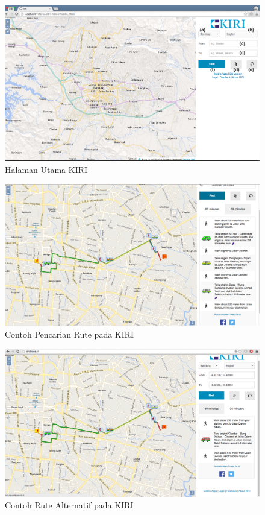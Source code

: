 \begin{figure}[H]
	\centering
	\includegraphics[scale=0.3]{Gambar/KIRI-main}
	\caption{Halaman Utama KIRI} 
	\label{fig:5_KIRI_main}
\end{figure}


\begin{figure}[H]
	\centering
	\includegraphics[scale=0.3]{Gambar/KIRI-find}
	\caption{Contoh Pencarian Rute pada KIRI} 
	\label{fig:5_KIRI_find}
\end{figure}

\begin{figure}[H]
	\centering
	\includegraphics[scale=0.3]{Gambar/KIRI-find-alternate}
	\caption{Contoh Rute Alternatif pada KIRI} 
	\label{fig:5_KIRI_find_alternate}
\end{figure}

